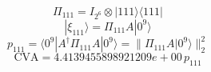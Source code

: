 \[
\Pi_{111} = I_{2^6}\otimes |111\rangle\langle 111|
\]
\[
|\xi_{111}\rangle = \Pi_{111}A|0^9\rangle
\]
\[
p_{111} = \langle 0^9|A^\dagger\Pi_{111}A|0^9\rangle = \|\Pi_{111}A|0^9\rangle\|_2^2
\]
\[
\mathrm{CVA} = 4.4139455898921209e+00\,p_{111}
\]
